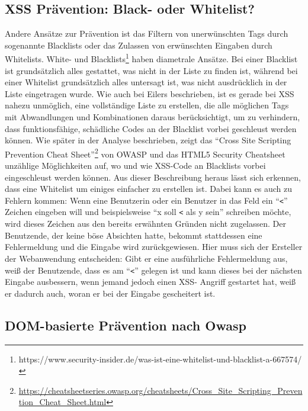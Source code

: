 \subsection{XSS Prävention: Black- oder Whitelist?}
\label{subsection:prevention_black_or_whitelists}

Andere Ansätze zur Prävention ist das Filtern von unerwünschten Tags durch sogenannte Blacklists oder das Zulassen von erwünschten Eingaben durch Whitelists. White- und Blacklists\footnote{https://www.security-insider.de/was-ist-eine-whitelist-und-blacklist-a-667574/} haben diametrale Ansätze. Bei einer Blacklist ist grundsätzlich alles gestattet, was nicht in der Liste zu finden ist, während bei einer Whitelist grundsätzlich alles untersagt ist, was nicht ausdrücklich in der Liste eingetragen wurde.
Wie auch bei Eilers beschrieben, ist es gerade bei XSS nahezu unmöglich, eine vollständige Liste zu erstellen, die alle möglichen Tags mit Abwandlungen und Kombinationen daraus berücksichtigt, um zu verhindern, dass funktionsfähige, schädliche Codes an der Blacklist vorbei geschleust werden können. Wie später in der Analyse beschrieben, zeigt das ``Cross Site Scripting Prevention Cheat Sheet''\footnote{\url{https://cheatsheetseries.owasp.org/cheatsheets/Cross_Site_Scripting_Prevention_Cheat_Sheet.html}} von OWASP und das HTML5 Security Cheatsheet unzählige Möglichkeiten auf, wo und wie XSS-Code an Blacklists vorbei eingeschleust werden können.
Aus dieser Beschreibung heraus lässt sich erkennen, dass eine Whitelist um einiges einfacher zu erstellen ist.  Dabei kann es auch zu Fehlern kommen: Wenn eine Benutzerin oder ein Benutzer in das Feld ein ``\verb+<+'' Zeichen eingeben will und beispielsweise ``x soll \verb+<+ als y sein'' schreiben möchte, wird dieses Zeichen aus den bereits erwähnten Gründen nicht zugelassen. Der Benutzende, der keine böse Absichten hatte, bekommt stattdessen eine Fehlermeldung und die Eingabe wird zurückgewiesen.  Hier muss sich der Ersteller der Webanwendung entscheiden: Gibt er eine ausführliche Fehlermeldung aus, weiß der Benutzende, dass es am ``\verb+<+'' gelegen ist und kann dieses bei der nächsten Eingabe ausbessern,  wenn  jemand jedoch einen XSS- Angriff gestartet hat, weiß er dadurch auch, woran er bei der Eingabe gescheitert ist.


\subsection{DOM-basierte Prävention nach Owasp}
\label{subsection:prevention_dom_based_owasp}

